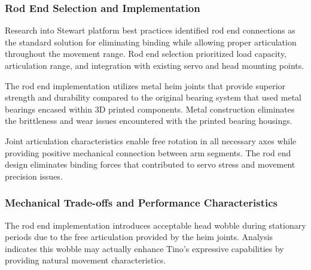 \subsubsection{Rod End Selection and Implementation}

Research into Stewart platform best practices identified rod end connections as the standard solution for eliminating binding while allowing proper articulation throughout the movement range. Rod end selection prioritized load capacity, articulation range, and integration with existing servo and head mounting points.

The rod end implementation utilizes metal heim joints that provide superior strength and durability compared to the original bearing system that used metal bearings encased within 3D printed components. Metal construction eliminates the brittleness and wear issues encountered with the printed bearing housings.

Joint articulation characteristics enable free rotation in all necessary axes while providing positive mechanical connection between arm segments. The rod end design eliminates binding forces that contributed to servo stress and movement precision issues.

\subsubsection{Mechanical Trade-offs and Performance Characteristics}

The rod end implementation introduces acceptable head wobble during stationary periods due to the free articulation provided by the heim joints. Analysis indicates this wobble may actually enhance Tino's expressive capabilities by providing natural movement characteristics.

